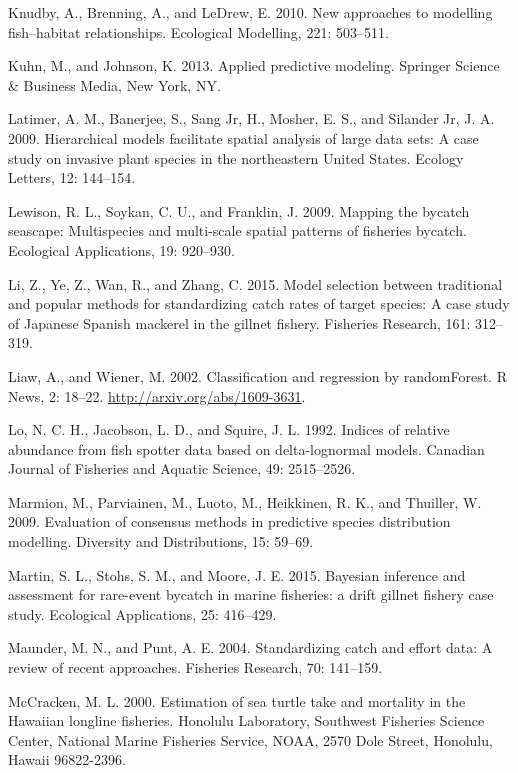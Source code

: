 \documentclass[]{article}
\begin{document}
\hypertarget{ref-knudby2010}{}
Knudby, A., Brenning, A., and LeDrew, E. 2010. New approaches to
modelling fish--habitat relationships. Ecological Modelling, 221:
503--511.

\hypertarget{ref-kuhn2013}{}
Kuhn, M., and Johnson, K. 2013. Applied predictive modeling. Springer
Science \& Business Media, New York, NY.

\hypertarget{ref-latimer2009}{}
Latimer, A. M., Banerjee, S., Sang Jr, H., Mosher, E. S., and Silander
Jr, J. A. 2009. Hierarchical models facilitate spatial analysis of large
data sets: A case study on invasive plant species in the northeastern
United States. Ecology Letters, 12: 144--154.

\hypertarget{ref-lewison2009}{}
Lewison, R. L., Soykan, C. U., and Franklin, J. 2009. Mapping the
bycatch seascape: Multispecies and multi-scale spatial patterns of
fisheries bycatch. Ecological Applications, 19: 920--930.

\hypertarget{ref-li2015}{}
Li, Z., Ye, Z., Wan, R., and Zhang, C. 2015. Model selection between
traditional and popular methods for standardizing catch rates of target
species: A case study of Japanese Spanish mackerel in the gillnet
fishery. Fisheries Research, 161: 312--319.

\hypertarget{ref-liaw2002}{}
Liaw, A., and Wiener, M. 2002. Classification and regression by
randomForest. R News, 2: 18--22. \url{http://arxiv.org/abs/1609-3631}.

\hypertarget{ref-lo1992}{}
Lo, N. C. H., Jacobson, L. D., and Squire, J. L. 1992. Indices of
relative abundance from fish spotter data based on delta-lognormal
models. Canadian Journal of Fisheries and Aquatic Science, 49:
2515--2526.

\hypertarget{ref-marmion2009}{}
Marmion, M., Parviainen, M., Luoto, M., Heikkinen, R. K., and Thuiller,
W. 2009. Evaluation of consensus methods in predictive species
distribution modelling. Diversity and Distributions, 15: 59--69.

\hypertarget{ref-martin2015}{}
Martin, S. L., Stohs, S. M., and Moore, J. E. 2015. Bayesian inference
and assessment for rare-event bycatch in marine fisheries: a drift
gillnet fishery case study. Ecological Applications, 25: 416--429.

\hypertarget{ref-maunder2004}{}
Maunder, M. N., and Punt, A. E. 2004. Standardizing catch and effort
data: A review of recent approaches. Fisheries Research, 70: 141--159.

\hypertarget{ref-mccracken2000}{}
McCracken, M. L. 2000. Estimation of sea turtle take and mortality in
the Hawaiian longline fisheries. Honolulu Laboratory, Southwest
Fisheries Science Center, National Marine Fisheries Service, NOAA, 2570
Dole Street, Honolulu, Hawaii 96822-2396.
\end{document}
